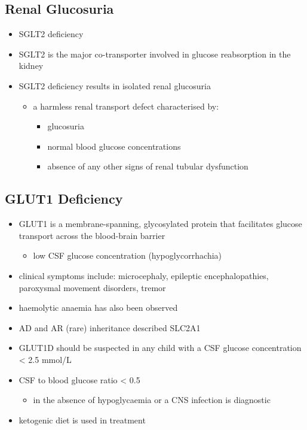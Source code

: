 \documentclass{scrartcl}
\begin{document}
\subsection{Renal Glucosuria}
\label{sec:org29f43bd}
\begin{itemize}
\item SGLT2 deficiency
\item SGLT2 is the major co-transporter involved in glucose reabsorption in
the kidney
\item SGLT2 deficiency results in isolated renal glucosuria
\begin{itemize}
\item a harmless renal transport defect characterised by:
\begin{itemize}
\item glucosuria
\item normal blood glucose concentrations
\item absence of any other signs of renal tubular dysfunction
\end{itemize}
\end{itemize}
\end{itemize}

\subsection{GLUT1 Deficiency}
\label{sec:orgce01dfa}
\begin{itemize}
\item GLUT1 is a membrane-spanning, glycosylated protein that facilitates
glucose transport across the blood-brain barrier
\begin{itemize}
\item low CSF glucose concentration (hypoglycorrhachia)
\end{itemize}
\item clinical symptoms include: microcephaly, epileptic encephalopathies,
paroxysmal movement disorders, tremor
\item haemolytic anaemia has also been observed
\item AD and AR (rare) inheritance described SLC2A1
\item GLUT1D should be suspected in any child with a CSF glucose
concentration \textless{} 2.5 mmol/L
\item CSF to blood glucose ratio \textless{} 0.5 
\begin{itemize}
\item in the absence of hypoglycaemia or a CNS infection is diagnostic
\end{itemize}
\item ketogenic diet is used in treatment
\end{itemize}
\end{document}
